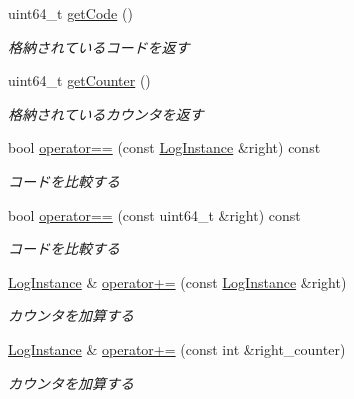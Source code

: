 \begin{DoxyCompactItemize}
\mbox{\label{class_g_a_1_1_log_instance_ad9ccca468988cdbf118d0ab4fd0dd0a9}} 
uint64\+\_\+t \mbox{\hyperlink{class_g_a_1_1_log_instance_ad9ccca468988cdbf118d0ab4fd0dd0a9}{get\+Code}} ()
\begin{DoxyCompactList}\small\item\em 格納されているコードを返す \end{DoxyCompactList}\item 
\mbox{\label{class_g_a_1_1_log_instance_a3d88f1acc4dbd7f696e05521950225b9}} 
uint64\+\_\+t \mbox{\hyperlink{class_g_a_1_1_log_instance_a3d88f1acc4dbd7f696e05521950225b9}{get\+Counter}} ()
\begin{DoxyCompactList}\small\item\em 格納されているカウンタを返す \end{DoxyCompactList}\item 
\mbox{\label{class_g_a_1_1_log_instance_a61d8eadb383720cb21a5949b85b69651}} 
bool \mbox{\hyperlink{class_g_a_1_1_log_instance_a61d8eadb383720cb21a5949b85b69651}{operator==}} (const \mbox{\hyperlink{class_g_a_1_1_log_instance}{Log\+Instance}} \&right) const
\begin{DoxyCompactList}\small\item\em コードを比較する \end{DoxyCompactList}\item 
\mbox{\label{class_g_a_1_1_log_instance_a83f61b601444d2f4d3c033283e7edb4b}} 
bool \mbox{\hyperlink{class_g_a_1_1_log_instance_a83f61b601444d2f4d3c033283e7edb4b}{operator==}} (const uint64\+\_\+t \&right) const
\begin{DoxyCompactList}\small\item\em コードを比較する \end{DoxyCompactList}\item 
\mbox{\label{class_g_a_1_1_log_instance_aa89b0a3d753da6a0f43fb8959486cf58}} 
\mbox{\hyperlink{class_g_a_1_1_log_instance}{Log\+Instance}} \& \mbox{\hyperlink{class_g_a_1_1_log_instance_aa89b0a3d753da6a0f43fb8959486cf58}{operator+=}} (const \mbox{\hyperlink{class_g_a_1_1_log_instance}{Log\+Instance}} \&right)
\begin{DoxyCompactList}\small\item\em カウンタを加算する \end{DoxyCompactList}\item 
\mbox{\label{class_g_a_1_1_log_instance_aa2947fad5dee81cac796083d10bd8fc8}} 
\mbox{\hyperlink{class_g_a_1_1_log_instance}{Log\+Instance}} \& \mbox{\hyperlink{class_g_a_1_1_log_instance_aa2947fad5dee81cac796083d10bd8fc8}{operator+=}} (const int \&right\+\_\+counter)
\begin{DoxyCompactList}\small\item\em カウンタを加算する \end{DoxyCompactList}\end{DoxyCompactItemize}
